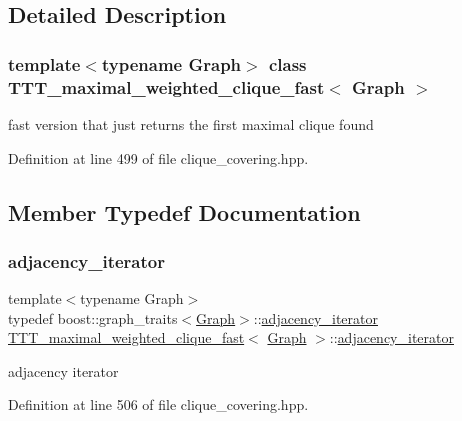 \subsection{Detailed Description}
\subsubsection*{template$<$typename Graph$>$\newline
class T\+T\+T\+\_\+maximal\+\_\+weighted\+\_\+clique\+\_\+fast$<$ Graph $>$}

fast version that just returns the first maximal clique found 

Definition at line 499 of file clique\+\_\+covering.\+hpp.



\subsection{Member Typedef Documentation}
\mbox{\label{classTTT__maximal__weighted__clique__fast_a75d8b34fb191bd1fbb4863931ebe9b7a}} 
\subsubsection{\texorpdfstring{adjacency\+\_\+iterator}{adjacency\_iterator}}
{\footnotesize\ttfamily template$<$typename Graph$>$ \\
typedef boost\+::graph\+\_\+traits$<$\hyperlink{structGraph}{Graph}$>$\+::\hyperlink{classTTT__maximal__weighted__clique__fast_a75d8b34fb191bd1fbb4863931ebe9b7a}{adjacency\+\_\+iterator} \hyperlink{classTTT__maximal__weighted__clique__fast}{T\+T\+T\+\_\+maximal\+\_\+weighted\+\_\+clique\+\_\+fast}$<$ \hyperlink{structGraph}{Graph} $>$\+::\hyperlink{classTTT__maximal__weighted__clique__fast_a75d8b34fb191bd1fbb4863931ebe9b7a}{adjacency\+\_\+iterator}\hspace{0.3cm}{\ttfamily [private]}}



adjacency iterator 



Definition at line 506 of file clique\+\_\+covering.\+hpp.

